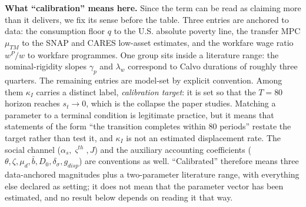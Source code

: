 \documentclass[review,12pt]{elsarticle}
\theoremstyle{plain}
\theoremstyle{definition}
\theoremstyle{remark}
\begin{document}
\smallskip\noindent\textbf{What ``calibration'' means here.} Since the term can be read as claiming more than it delivers, we fix its sense before the table. Three entries are anchored to data: the consumption floor $q$ to the U.S. absolute poverty line, the transfer MPC $\mu_{TM}$ to the SNAP and CARES low-asset estimates, and the workfare wage ratio $w^P/w$ to workfare programmes. One group sits inside a literature range: the nominal-rigidity slopes $\gamma_p$ and $\lambda_w$ correspond to Calvo durations of roughly three quarters. The remaining entries are model-set by explicit convention. Among them $\kappa_I$ carries a distinct label, \emph{calibration target}: it is set so that the $T=80$ horizon reaches $s_t\to0$, which is the collapse the paper studies. Matching a parameter to a terminal condition is legitimate practice, but it means that statements of the form ``the transition completes within 80 periods'' restate the target rather than test it, and $\kappa_I$ is not an estimated displacement rate. The social channel ($\alpha_s,\varsigma^{th},J$) and the auxiliary accounting coefficients ($\theta,\zeta,\mu_d,\bar b,D_0,\delta_\sigma,g_{disp}$) are conventions as well. ``Calibrated'' therefore means three data-anchored magnitudes plus a two-parameter literature range, with everything else declared as setting; it does not mean that the parameter vector has been estimated, and no result below depends on reading it that way.
\end{document}
